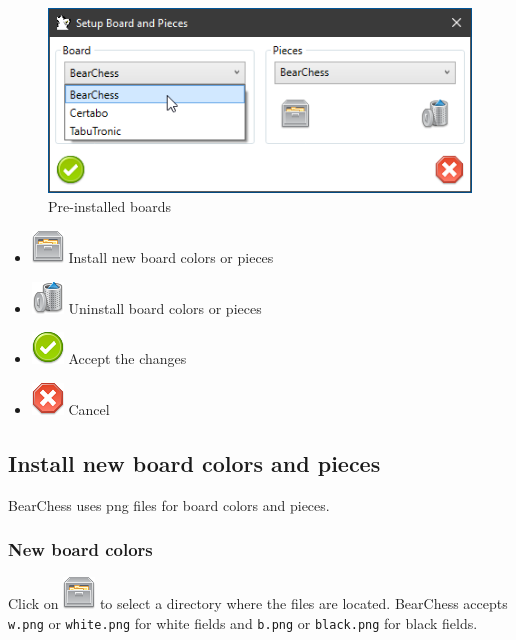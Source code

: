 \documentclass[11pt,a4paper]{article}
\begin{document}
	\begin{figure}[H]
		\centering
		\includegraphics[scale=0.9]{SettingsBoardAndPieces4.png}
		\caption{Pre-installed boards}
		\label{fig:SettingsBoardAndPieces4}
	\end{figure}
	
	
	\begin{itemize}
		\item \includegraphics[scale=0.5]{file_manager.png} Install new board colors or pieces
		\item \includegraphics[scale=0.5]{bin.png} Uninstall board colors or pieces
		\item \includegraphics[scale=0.5]{accept_button.png} Accept the changes
		\item \includegraphics[scale=0.5]{cancel.png} Cancel
	\end{itemize}
	
	
	
	
	\subsection{Install new board colors and pieces}
	BearChess uses png files for board colors and pieces.
	
	\subsubsection{New board colors}
	Click on \includegraphics[scale=0.5]{file_manager.png} to select a directory where the files are located. BearChess accepts \verb|w.png| or \verb|white.png| for white fields and \verb|b.png| or \verb|black.png| for black fields.
	
\end{document}
